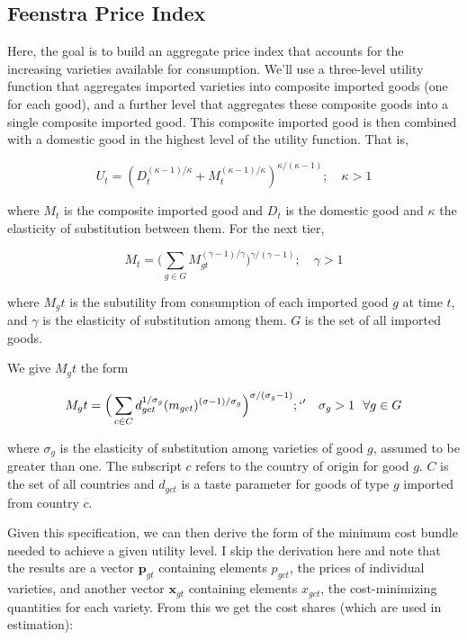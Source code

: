 \documentclass[12pt,a4paper,hidelinks]{article}            %
\begin{document}
\subsection{Feenstra Price Index}
\label{sub:feenstra_price_index}

Here, the goal is to build an aggregate price index that accounts for the increasing varieties available for consumption.  We'll use a three-level utility function that aggregates imported varieties into composite imported goods (one for each good), and a further level that aggregates these composite goods into a single composite imported good.  This composite imported good is then combined with a domestic good in the highest level of the utility function.  That is,

\begin{equation}
    U_t = (D_t^{(\kappa - 1)/\kappa} + M_t^{(\kappa - 1)/\kappa})^{\kappa/(\kappa - 1)}; \quad \kappa > 1
\end{equation}

where $M_t$ is the composite imported good and $D_t$ is the domestic good and $\kappa$ the elasticity of substitution between them.  For the next tier,

\begin{equation}
    M_t = \Big(\sum_{g \in G} M_{gt}^{(\gamma - 1) / \gamma}\Big)^{\gamma/(\gamma - 1)}; \quad \gamma > 1
\end{equation}

where $M_gt$ is the subutility from consumption of each imported good $g$ at time $t$, and $\gamma$ is the elasticity of substitution among them.  $G$ is the set of all imported goods.

We give $M_gt$ the form

\begin{equation}
    M_gt = \Big( \sum_{c \in C} d_{gct}^{1 / \sigma_g}(m_{gct})^{(\sigma - 1) / \sigma_g}  \Big) ^ {\sigma / (\sigma_g - 1)};`' \quad \sigma_g > 1 \ \ \forall g \in G
\end{equation}

where $\sigma_g$ is the elasticity of substitution among varieties of good $g$, assumed to be greater than one.  The subscript $c$ refers to the country of origin for good $g$.  $C$ is the set of all countries and $d_{gct}$ is a taste parameter for goods of type $g$ imported from country $c$.

Given this specification, we can then derive the form of the minimum cost bundle needed to achieve a given utility level.  I skip the derivation here and note that the results are a vector $\mathbf{p}_{gt}$ containing elements $p_{gct}$, the prices of individual varieties, and another vector $\mathbf{x}_{gt}$ containing elements $x_{gct}$, the cost-minimizing quantities for each variety.  From this we get the cost shares (which are used in estimation):
\end{document}
